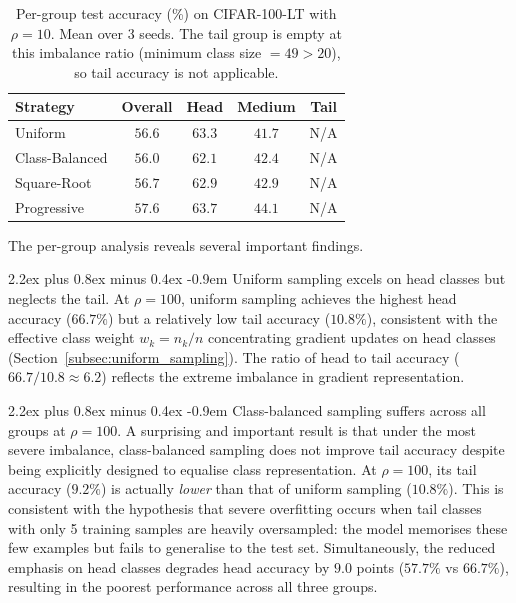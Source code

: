 \documentclass[12pt,a4paper]{article}
\makeatletter
\renewcommand{\paragraph}{\@startsection{paragraph}{4}{\z@}%
  {2.2ex plus 0.8ex minus 0.4ex}%
  {-0.9em}%
  {\normalfont\normalsize\bfseries}}
\makeatother
\begin{document}
\begin{table}[H]
    \centering
    \caption{Per-group test accuracy (\%) on CIFAR-100-LT with $\rho = 10$. Mean over 3 seeds. The tail group is empty at this imbalance ratio (minimum class size $= 49 > 20$), so tail accuracy is not applicable.}
    \label{tab:hmt_rho10}
    \begin{tabular}{lcccc}
        \toprule
        \textbf{Strategy} & \textbf{Overall} & \textbf{Head} & \textbf{Medium} & \textbf{Tail} \\
        \midrule
        Uniform        & $56.6$ & $63.3$          & $41.7$ & N/A \\
        Class-Balanced & $56.0$ & $62.1$          & $42.4$ & N/A \\
        Square-Root    & $56.7$ & $62.9$          & $42.9$ & N/A \\
        Progressive    & $\mathbf{57.6}$ & $\mathbf{63.7}$ & $\mathbf{44.1}$ & N/A \\
        \bottomrule
    \end{tabular}
\end{table}

The per-group analysis reveals several important findings.

\paragraph{Uniform sampling excels on head classes but neglects the tail.} At $\rho = 100$, uniform sampling achieves the highest head accuracy ($66.7\%$) but a relatively low tail accuracy ($10.8\%$), consistent with the effective class weight $w_k = n_k/n$ concentrating gradient updates on head classes (Section~\ref{subsec:uniform_sampling}). The ratio of head to tail accuracy ($66.7 / 10.8 \approx 6.2$) reflects the extreme imbalance in gradient representation.

\paragraph{Class-balanced sampling suffers across all groups at $\rho = 100$.} A surprising and important result is that under the most severe imbalance, class-balanced sampling does not improve tail accuracy despite being explicitly designed to equalise class representation. At $\rho = 100$, its tail accuracy ($9.2\%$) is actually \emph{lower} than that of uniform sampling ($10.8\%$). This is consistent with the hypothesis that severe overfitting occurs when tail classes with only 5 training samples are heavily oversampled: the model memorises these few examples but fails to generalise to the test set. Simultaneously, the reduced emphasis on head classes degrades head accuracy by $9.0$ points ($57.7\%$ vs $66.7\%$), resulting in the poorest performance across all three groups.
\end{document}
